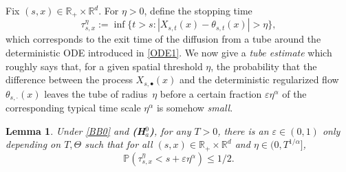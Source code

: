 \documentclass[JEP,XML,SOM,Unicode,published]{cedram}
\theoremstyle{plain}
\newtheorem{lemma}[theorem]{Lemma}
\theoremstyle{definition}
\let\eps\varepsilon
\newcommand\mP{\mathbb{P}}
\newcommand\mR{\mathbb{R}}
\newcommand\1{{\mathbf{1}}}
\begin{document}
Fix $(s,x)\in\mR_+\times\mR^d$. For $\eta>0$, define the stopping time
\begin{equation}\label{DH1}
\tau^\eta_{s,x}:=\inf\bigl\{t>s: |X_{s,t}(x)-\theta_{s,t}(x)|>\eta\bigr\},
\end{equation}
which corresponds to the exit time of the diffusion from a tube around the deterministic ODE introduced in \eqref{ODE1}.
We now give a \textit{tube estimate} which roughly says that, for a given spatial threshold $\eta$, the probability that the difference between the process $X_{s,{\scriptscriptstyle\bullet}}(x)$ and the deterministic regularized flow $\theta_{s,\cdot}(x) $ leaves the tube of radius~$\eta $ before a certain fraction $\varepsilon \eta^\alpha $ of the corresponding typical time scale $\eta^\alpha $ is somehow \textit{small}.
\begin{lemma}\label{Le23}
Under \eqref{BB0} and {\bf (H$^0_a$)}, for any $T>0$,
there is an $\eps\in(0,1)$ only depending on $T,\Theta$ such that
for all $(s,x)\in\mR_+\times\mR^d$ and $\eta\in(0,T^{1/\alpha}]$,
\[
\mP(\tau^\eta_{s,x}<s+\eps\eta^\alpha)\leq 1/2.
\]
\end{lemma}
\end{document}
